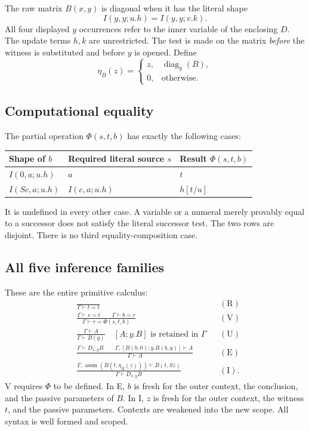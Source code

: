 \documentclass[11pt]{article}
\theoremstyle{definition}\newtheorem{definition}[theorem]{Definition}
\theoremstyle{remark}\newtheorem{remark}[theorem]{Remark}
\newcommand{\assm}{\operatorname{assm}}
\newcommand{\diag}{\operatorname{diag}}
\begin{document}
The raw matrix $B(x,y)$ is diagonal when it has the literal shape
\begin{equation}\label{eq:diagonal}
 I(y,y;u.h)=I(y,y;v.k).
\end{equation}
All four displayed $y$ occurrences refer to the inner variable of the enclosing $D$. The update terms $h,k$ are unrestricted. The test is made on the matrix \emph{before} the witness is substituted and before $y$ is opened. Define
\[
 \eta_B(z)=\begin{cases}z,&\diag_y(B),\\0,&\text{otherwise}.\end{cases}
\]

\subsection{Computational equality}

The partial operation $\Phi(s,t,b)$ has exactly the following cases:
\begin{center}
\begin{tabular}{lll}
\toprule
Shape of $b$ & Required literal source $s$ & Result $\Phi(s,t,b)$\\
\midrule
$I(0,a;u.h)$ & $a$ & $t$\\
$I(Sc,a;u.h)$ & $I(c,a;u.h)$ & $h[t/u]$\\
\bottomrule
\end{tabular}
\end{center}
It is undefined in every other case. A variable or a numeral merely provably equal to a successor does not satisfy the literal successor test. The two rows are disjoint. There is no third equality-composition case.

\subsection{All five inference families}

These are the entire primitive calculus:
\begin{align*}
 &\frac{}{\Gamma\vdash t=t} &&(\mathrm R)\\[7pt]
 &\frac{\Gamma\vdash s=t\qquad\Gamma\vdash b=r}
 {\Gamma\vdash r=\Phi(s,t,b)} &&(\mathrm V)\\[7pt]
 &\frac{\Gamma\vdash A}{\Gamma\vdash B(q)}
 \quad [A;y.B]\text{ is retained in }\Gamma &&(\mathrm U)\\[7pt]
 &\frac{\Gamma\vdash D_{x,y}B\qquad
 \Gamma,[B(b,0);y.B(b,y)]\vdash A}{\Gamma\vdash A} &&(\mathrm E)\\[7pt]
 &\frac{\Gamma,\assm(B(t,\eta_B(z)))\vdash B(t,Sz)}
 {\Gamma\vdash D_{x,y}B} &&(\mathrm I).
\end{align*}
V requires $\Phi$ to be defined. In E, $b$ is fresh for the outer context, the conclusion, and the passive parameters of $B$. In I, $z$ is fresh for the outer context, the witness $t$, and the passive parameters. Contexts are weakened into the new scope. All syntax is well formed and scoped.
\end{document}
